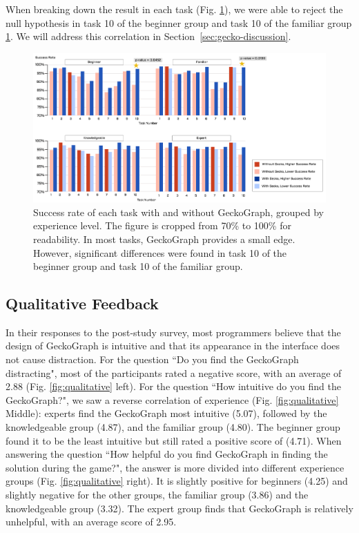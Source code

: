 When breaking down the result in each task (Fig. \ref{fig:success-rate}), we were able to reject the null hypothesis in task 10 of the beginner group and task 10 of the familiar group \ref{fig:success-rate}. We will address this correlation in Section~\ref{sec:gecko-discussion}.


\begin{figure}[hbt]
  \includegraphics[width=\linewidth]{figures/SuccessfulRate}
  \caption[Success rate of each task with and without GeckoGraph, grouped by experience level]{\label{fig:success-rate}Success rate of each task with and without GeckoGraph, grouped by experience level. The figure is cropped from 70\% to 100\% for readability. In most tasks, GeckoGraph provides a small edge. However, significant differences were found in task 10 of the beginner group and task 10 of the familiar group. }
\end{figure}

\subsection{Qualitative Feedback}
In their responses to the post-study survey, most programmers believe that the design of GeckoGraph is intuitive and that its appearance in the interface does not cause distraction.
For the question ``Do you find the GeckoGraph distracting", most of the participants rated a negative score, with an average of 2.88 (Fig. \ref{fig:qualitative} left). For the question ``How intuitive do you find the GeckoGraph?", we saw a reverse correlation of experience (Fig. \ref{fig:qualitative} Middle): experts find the GeckoGraph most intuitive (5.07), followed by the knowledgeable group (4.87), and the familiar group (4.80). The beginner group found it to be the least intuitive but still rated a positive score of (4.71). 
 When answering the question ``How helpful do you find GeckoGraph in finding the solution during the game?", the answer is more divided into different experience groups (Fig. \ref{fig:qualitative} right). It is slightly positive for beginners (4.25) and slightly negative for the other groups, the familiar group (3.86) and the knowledgeable group (3.32). The expert group finds that GeckoGraph is relatively unhelpful, with an average score of 2.95.




